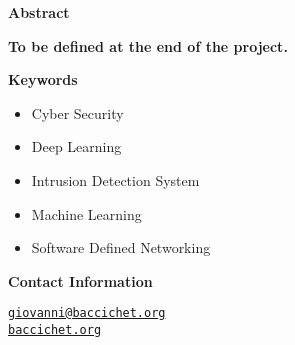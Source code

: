 \thispagestyle{empty}

{\bf\Huge Abstract}

\vspace{1cm}

\faEdit \quad \textbf{To be defined at the end of the project.} \\

\textcolor{dimgray}{\lipsum[1-3]}

\vspace{1cm}

{\bf\Huge Keywords}

\vspace{1cm}

\begin{itemize}
    \item[\faCaretRight] Cyber Security
    \item[\faCaretRight] Deep Learning
    \item[\faCaretRight] Intrusion Detection System
    \item[\faCaretRight] Machine Learning
    \item[\faCaretRight] Software Defined Networking
\end{itemize}

\vspace{1cm}

{\bf\Huge Contact Information}

\vspace{1cm}

\faEnvelope[regular] \quad \href{mailto:giovanni@baccichet.org}{\texttt{giovanni@baccichet.org}} \\

\faGlobeAmericas \quad\; \href{https://baccichet.org}{\texttt{baccichet.org}}



